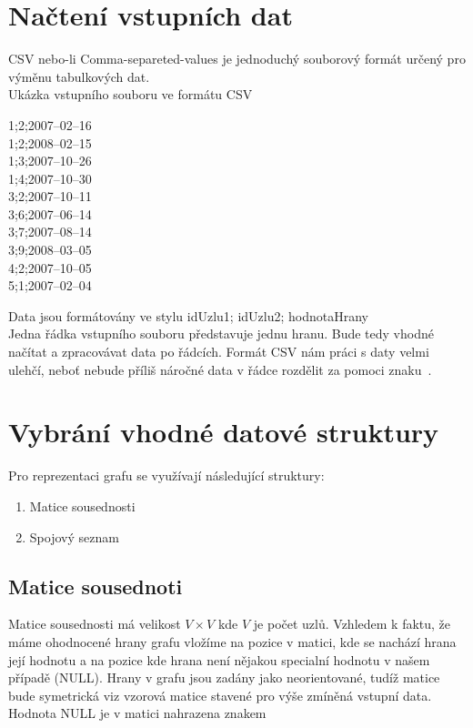 \section{Načtení vstupních dat}
CSV nebo-li Comma-separeted-values je jednoduchý souborový formát určený pro výměnu tabulkových dat.\\

Ukázka vstupního souboru ve formátu CSV
\begin{framed}
	1;2;2007--02--16\\
	1;2;2008--02--15\\
	1;3;2007--10--26\\
	1;4;2007--10--30\\
	3;2;2007--10--11\\
	3;6;2007--06--14\\
	3;7;2007--08--14\\
	3;9;2008--03--05\\
	4;2;2007--10--05\\
	5;1;2007--02--04
\end{framed}

Data jsou formátovány ve stylu idUzlu1; idUzlu2; hodnotaHrany\\

Jedna řádka vstupního souboru představuje jednu hranu. Bude tedy vhodné načítat a zpracovávat data po řádcích. Formát CSV nám práci s daty velmi ulehčí, neboť nebude příliš náročné data v řádce rozdělit za pomoci znaku~\uv{\textbf{;}}.

\section{Vybrání vhodné datové struktury}
Pro reprezentaci grafu se využívají následující struktury:
\begin{enumerate}
	\item Matice sousednosti
	\item Spojový seznam
\end{enumerate}

\subsection{Matice sousednoti}
Matice sousednosti má velikost $V \times V$ kde $V$ je počet uzlů. Vzhledem k faktu, že máme ohodnocené hrany grafu vložíme na pozice v matici, kde se nachází hrana její hodnotu a na pozice kde hrana není nějakou specialní hodnotu v našem případě (NULL). Hrany v grafu jsou zadány jako neorientované, tudíž matice bude symetrická viz vzorová matice stavené pro výše zmíněná vstupní data. Hodnota NULL je v matici nahrazena znakem \uv{--}\\

